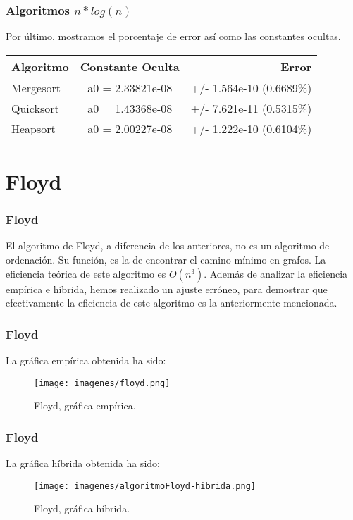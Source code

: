 \documentclass{beamer}
\begin{document}
\begin{frame}
	\frametitle{Algoritmos $n*log(n)$}
	Por último, mostramos el porcentaje de error así como las constantes ocultas.\\
	
	\begin{center}
		\begin{tabular}{| l | c | r |}
			\hline
			\textbf{Algoritmo} & \textbf{Constante Oculta} & \textbf{Error} \\ \hline
			Mergesort & a0 = 2.33821e-08 & +/- 1.564e-10 (0.6689\%)\\ \hline
			Quicksort & a0 = 1.43368e-08 & +/- 7.621e-11 (0.5315\%) \\ \hline
			Heapsort & a0 = 2.00227e-08 & +/- 1.222e-10    (0.6104\%) \\ \hline
		\end{tabular}
	\end{center}

	
	
\end{frame}

\section{Floyd}
\begin{frame}
	\frametitle{Floyd}
	El algoritmo de Floyd, a diferencia de los anteriores, no es un algoritmo de ordenación. Su función, es la de encontrar el camino mínimo en grafos. La eficiencia teórica de este algoritmo es $O(n^3)$. Además de analizar la eficiencia empírica e híbrida, hemos realizado un ajuste erróneo, para demostrar que efectivamente la eficiencia de este algoritmo es la anteriormente mencionada.
\end{frame}

\begin{frame}
	\frametitle{Floyd}
	La gráfica empírica obtenida ha sido:
	\begin{figure}
		\centering
		\texttt{[image: imagenes/floyd.png]}
		\caption{Floyd, gráfica empírica.}
		\label{fig:E16}
	\end{figure}
	
\end{frame}

\begin{frame}
	\frametitle{Floyd}
	La gráfica híbrida obtenida ha sido:
	\begin{figure}
		\centering
		\texttt{[image: imagenes/algoritmoFloyd-hibrida.png]}
		\caption{Floyd, gráfica híbrida.}
		\label{fig:E17}
	\end{figure}
\end{frame}
\end{document}

